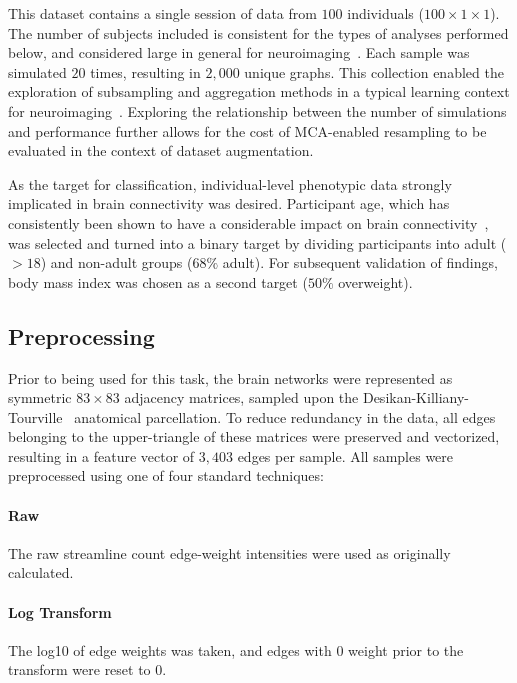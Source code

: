 \documentclass[num-refs]{nbdt-article}
\begin{document}
This dataset contains a single session of data from $100$ individuals ($100\times 1 \times1$). The number of subjects included is consistent for the types of analyses performed below, and considered large in general for neuroimaging~\cite{neuroimagingsamplesize}. Each sample was simulated $20$ times, resulting in $2,000$ unique graphs. This collection enabled the exploration of subsampling and aggregation methods in a typical learning context for neuroimaging~\cite{Dimitriadis2017-pd,Buchanan2014-pm}. Exploring the relationship between the number of simulations and performance further allows for the cost of MCA-enabled resampling to be evaluated in the context of dataset augmentation.

As the target for classification, individual-level phenotypic data strongly implicated in brain connectivity was desired. Participant age, which has consistently been shown to have a considerable impact on brain connectivity~\cite{Meier2012-ve,Wu2012-uc,Bookheimer2019-ti,Zhao2015-rm}, was selected and turned into a binary target by dividing participants into adult ($>18$) and non-adult groups ($68\%$ adult). For subsequent validation of findings, body mass index was chosen as a second target ($50\%$ overweight).

\subsection{Preprocessing}
Prior to being used for this task, the brain networks were represented as symmetric $83 \times 83$ adjacency matrices, sampled upon the Desikan-Killiany-Tourville~\cite{Klein2012-vi} anatomical parcellation. To reduce redundancy in the data, all edges belonging to the upper-triangle of these matrices were preserved and vectorized, resulting in a feature vector of $3,403$ edges per sample. All samples were preprocessed using one of four standard techniques:

\paragraph{Raw} The raw streamline count edge-weight intensities were used as originally calculated.

\paragraph{Log Transform} The log10 of edge weights was taken, and edges with $0$ weight prior to the transform were reset to $0$.
\end{document}
